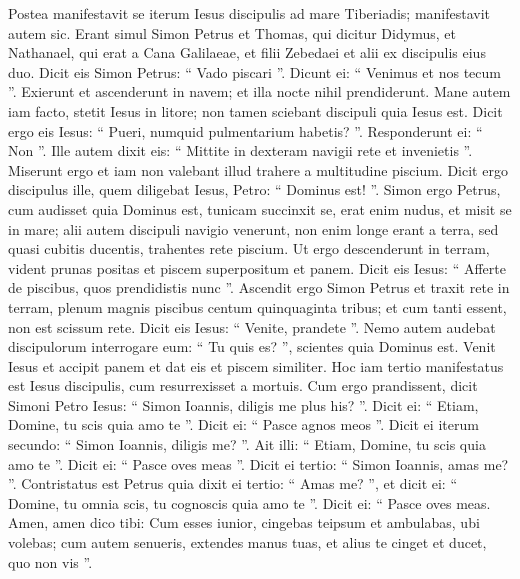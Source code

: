 \begin{biblechapter}
\begin{biblechapter}
\begin{biblechapter}
\begin{biblechapter}
\begin{biblechapter}
\begin{biblechapter}
\begin{biblechapter}
\begin{biblechapter}
\begin{biblechapter}
\begin{biblechapter}
\begin{biblechapter}
\begin{biblechapter}
\begin{biblechapter}
\begin{biblechapter}
\begin{biblechapter}
\begin{biblechapter}
\begin{biblechapter}
\begin{biblechapter}
\begin{biblechapter}
\begin{biblechapter}
\begin{biblechapter}
\verse Postea manifestavit se iterum Iesus discipulis ad mare Tiberiadis; manifestavit autem sic. 
\verse Erant simul Simon Petrus et Thomas, qui dicitur Didymus, et Nathanael, qui erat a Cana Galilaeae, et filii Zebedaei et alii ex discipulis eius duo. 
\verse Dicit eis Simon Petrus: “ Vado piscari ”. Dicunt ei: “ Venimus et nos tecum ”. Exierunt et ascenderunt in navem; et illa nocte nihil prendiderunt.
 \verse Mane autem iam facto, stetit Iesus in litore; non tamen sciebant discipuli quia Iesus est. 
\verse Dicit ergo eis Iesus: “ Pueri, numquid pulmentarium habetis? ”. Responderunt ei: “ Non ”. 
\verse Ille autem dixit eis: “ Mittite in dexteram navigii rete et invenietis ”. Miserunt ergo et iam non valebant illud trahere a multitudine piscium. 
\verse Dicit ergo discipulus ille, quem diligebat Iesus, Petro: “ Dominus est! ”. Simon ergo Petrus, cum audisset quia Dominus est, tunicam succinxit se, erat enim nudus, et misit se in mare; 
\verse alii autem discipuli navigio venerunt, non enim longe erant a terra, sed quasi cubitis ducentis, trahentes rete piscium.
 \verse Ut ergo descenderunt in terram, vident prunas positas et piscem superpositum et panem. 
\verse Dicit eis Iesus: “ Afferte de piscibus, quos prendidistis nunc ”. 
\verse Ascendit ergo Simon Petrus et traxit rete in terram, plenum magnis piscibus centum quinquaginta tribus; et cum tanti essent, non est scissum rete. 
\verse Dicit eis Iesus: “ Venite, prandete ”. Nemo autem audebat discipulorum interrogare eum: “ Tu quis es? ”, scientes quia Dominus est.
\verse Venit Iesus et accipit panem et dat eis et piscem similiter. 
\verse Hoc iam tertio manifestatus est Iesus discipulis, cum resurrexisset a mortuis.
 \verse Cum ergo prandissent, dicit Simoni Petro Iesus: “ Simon Ioannis, diligis me plus his? ”. Dicit ei: “ Etiam, Domine, tu scis quia amo te ”. Dicit ei: “ Pasce agnos meos ”. 
\verse Dicit ei iterum secundo: “ Simon Ioannis, diligis me? ”. Ait illi: “ Etiam, Domine, tu scis quia amo te ”. Dicit ei: “ Pasce oves meas ”. 
 \verse Dicit ei tertio: “ Simon Ioannis, amas me? ”. Contristatus est Petrus quia dixit ei tertio: “ Amas me? ”, et dicit ei: “ Domine, tu omnia scis, tu cognoscis quia amo te ”. Dicit ei: “ Pasce oves meas. 
\verse Amen, amen dico tibi: Cum esses iunior, cingebas teipsum et ambulabas, ubi volebas; cum autem senueris, extendes manus tuas, et alius te cinget et ducet, quo non vis ”. 

\end{biblechapter}
\end{biblechapter}
\end{biblechapter}
\end{biblechapter}
\end{biblechapter}
\end{biblechapter}
\end{biblechapter}
\end{biblechapter}
\end{biblechapter}
\end{biblechapter}
\end{biblechapter}
\end{biblechapter}
\end{biblechapter}
\end{biblechapter}
\end{biblechapter}
\end{biblechapter}
\end{biblechapter}
\end{biblechapter}
\end{biblechapter}
\end{biblechapter}
\end{biblechapter}
